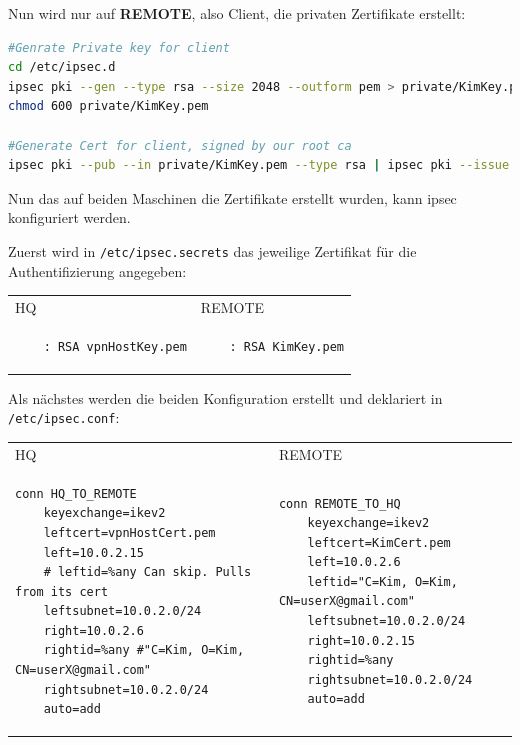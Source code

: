 Nun wird nur auf \textbf{REMOTE}, also Client, die privaten Zertifikate erstellt:

\begin{lstlisting}[language=bash]
#Genrate Private key for client
cd /etc/ipsec.d
ipsec pki --gen --type rsa --size 2048 --outform pem > private/KimKey.pem
chmod 600 private/KimKey.pem

#Generate Cert for client, signed by our root ca
ipsec pki --pub --in private/KimKey.pem --type rsa | ipsec pki --issue --lifetime 730 --cacert cacerts/strongswanCert.pem --cakey private/strongswanKey.pem --dn "C=Kim, O=Kim, CN=kim@example.com" --san "kim@example.org" --san "kim@example.net" --san "kim@xxx.xx.xx.xx" --outform pem > certs/KimCert.pem
\end{lstlisting}

Nun das auf beiden Maschinen die Zertifikate erstellt wurden, kann ipsec konfiguriert werden.

Zuerst wird in \verb|/etc/ipsec.secrets| das jeweilige Zertifikat für die Authentifizierung angegeben:

\begin{tabular}{p{8cm} p{8cm}}
	HQ  &   REMOTE\\
	\begin{lstlisting}
	: RSA vpnHostKey.pem
	\end{lstlisting}&
	\begin{lstlisting}
	: RSA KimKey.pem
	\end{lstlisting}
\end{tabular} 

Als nächstes werden die beiden Konfiguration erstellt und deklariert in \verb|/etc/ipsec.conf|:

\begin{tabular}{p{8cm} p{8cm}}
	HQ  &   REMOTE\\
	\begin{lstlisting}
conn HQ_TO_REMOTE
	keyexchange=ikev2
	leftcert=vpnHostCert.pem
	left=10.0.2.15
	# leftid=%any Can skip. Pulls from its cert
	leftsubnet=10.0.2.0/24
	right=10.0.2.6
	rightid=%any #"C=Kim, O=Kim, CN=userX@gmail.com"
	rightsubnet=10.0.2.0/24
	auto=add
	\end{lstlisting}&
	\begin{lstlisting}
conn REMOTE_TO_HQ
	keyexchange=ikev2
	leftcert=KimCert.pem
	left=10.0.2.6
	leftid="C=Kim, O=Kim, CN=userX@gmail.com"
	leftsubnet=10.0.2.0/24
	right=10.0.2.15
	rightid=%any
	rightsubnet=10.0.2.0/24
	auto=add
	\end{lstlisting}
\end{tabular} 
\clearpage

